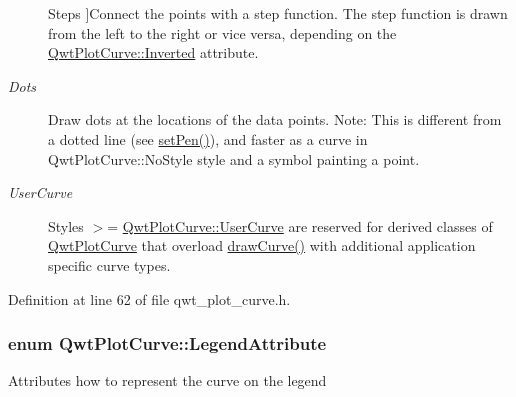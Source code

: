 \begin{Desc}
\begin{description}
{\hypertarget{class_qwt_plot_curve_a15998aa80a11ba6ba80eebabaf773f70a18071408a0b9bfe58378c6d81e207b2c}{Steps}\label{class_qwt_plot_curve_a15998aa80a11ba6ba80eebabaf773f70a18071408a0b9bfe58378c6d81e207b2c}
}]Connect the points with a step function. The step function is drawn from the left to the right or vice versa, depending on the \hyperlink{class_qwt_plot_curve_a38064f7de6f026a49db782c365f872c3af7790b4716576fd0641ec393f476bc46}{Qwt\-Plot\-Curve\-::\-Inverted} attribute. \item[{\em 
\hypertarget{class_qwt_plot_curve_a15998aa80a11ba6ba80eebabaf773f70ac30a3c76d19bc69fc69bed68fc154838}{Dots}\label{class_qwt_plot_curve_a15998aa80a11ba6ba80eebabaf773f70ac30a3c76d19bc69fc69bed68fc154838}
}]Draw dots at the locations of the data points. Note\-: This is different from a dotted line (see \hyperlink{class_qwt_plot_curve_a08328abaf2c3b67e479d1e485d2d0c4d}{set\-Pen()}), and faster as a curve in Qwt\-Plot\-Curve\-::\-No\-Style style and a symbol painting a point. \item[{\em 
\hypertarget{class_qwt_plot_curve_a15998aa80a11ba6ba80eebabaf773f70a7d8b49e6cead1de23860e1c68d17dee3}{User\-Curve}\label{class_qwt_plot_curve_a15998aa80a11ba6ba80eebabaf773f70a7d8b49e6cead1de23860e1c68d17dee3}
}]Styles $>$= \hyperlink{class_qwt_plot_curve_a15998aa80a11ba6ba80eebabaf773f70a7d8b49e6cead1de23860e1c68d17dee3}{Qwt\-Plot\-Curve\-::\-User\-Curve} are reserved for derived classes of \hyperlink{class_qwt_plot_curve}{Qwt\-Plot\-Curve} that overload \hyperlink{class_qwt_plot_curve_a9a1188e6abab05ed66ee7aebfc3d3679}{draw\-Curve()} with additional application specific curve types. \end{description}
\end{Desc}


Definition at line 62 of file qwt\-\_\-plot\-\_\-curve.\-h.

\hypertarget{class_qwt_plot_curve_a6c1ac1ca99c06598c4044dd2ceeb9fd7}{
\subsubsection[{Legend\-Attribute}]{\setlength{\rightskip}{0pt plus 5cm}enum {\bf Qwt\-Plot\-Curve\-::\-Legend\-Attribute}}}\label{class_qwt_plot_curve_a6c1ac1ca99c06598c4044dd2ceeb9fd7}
Attributes how to represent the curve on the legend

